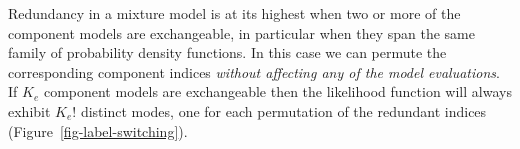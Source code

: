 \documentclass[
  letterpaper,
  DIV=11,
  numbers=noendperiod]{scrartcl}
\begin{document}
Redundancy in a mixture model is at its highest when two or more of the
component models are exchangeable, in particular when they span the same
family of probability density functions. In this case we can permute the
corresponding component indices \emph{without affecting any of the model
evaluations}. If \(K_{e}\) component models are exchangeable then the
likelihood function will always exhibit \(K_{e}!\) distinct modes, one
for each permutation of the redundant indices
(Figure~\ref{fig-label-switching}).

\begin{figure}

\begin{minipage}{0.28\linewidth}
~\end{minipage}%
%
\begin{minipage}{0.45\linewidth}


\subcaption{\label{fig-label-switching-like}}

\end{minipage}%
%
\begin{minipage}{0.28\linewidth}
~\end{minipage}%
\newline
\begin{minipage}{0.05\linewidth}
~\end{minipage}%
%
\begin{minipage}{0.45\linewidth}

\centering{

}
\end{minipage}
\end{figure}
\end{document}
